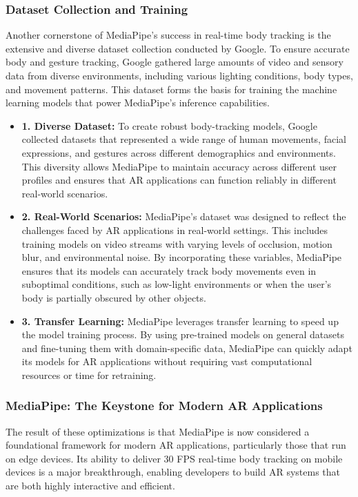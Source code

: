 \subsubsection{ Dataset Collection and Training}

Another cornerstone of MediaPipe’s success in real-time body tracking is the extensive and diverse dataset collection conducted by Google.
To ensure accurate body and gesture tracking, Google gathered large amounts of video and sensory data from diverse environments, including various lighting conditions, body types, and movement patterns.
This dataset forms the basis for training the machine learning models that power MediaPipe’s inference capabilities.

\begin{itemize}
    \item \textbf{1. Diverse Dataset:} To create robust body-tracking models, Google collected datasets that represented a wide range of human movements, facial expressions, and gestures across different demographics and environments. This diversity allows MediaPipe to maintain accuracy across different user profiles and ensures that AR applications can function reliably in different real-world scenarios.
    \item \textbf{2. Real-World Scenarios:} MediaPipe’s dataset was designed to reflect the challenges faced by AR applications in real-world settings. This includes training models on video streams with varying levels of occlusion, motion blur, and environmental noise. By incorporating these variables, MediaPipe ensures that its models can accurately track body movements even in suboptimal conditions, such as low-light environments or when the user’s body is partially obscured by other objects.
    \item \textbf{3. Transfer Learning:} MediaPipe leverages transfer learning to speed up the model training process. By using pre-trained models on general datasets and fine-tuning them with domain-specific data, MediaPipe can quickly adapt its models for AR applications without requiring vast computational resources or time for retraining.
\end{itemize}

\subsubsection{ MediaPipe: The Keystone for Modern AR Applications}

The result of these optimizations is that MediaPipe is now considered a foundational framework for modern AR applications, particularly those that run on edge devices.
Its ability to deliver 30 FPS real-time body tracking on mobile devices is a major breakthrough, enabling developers to build AR systems that are both highly interactive and efficient.


